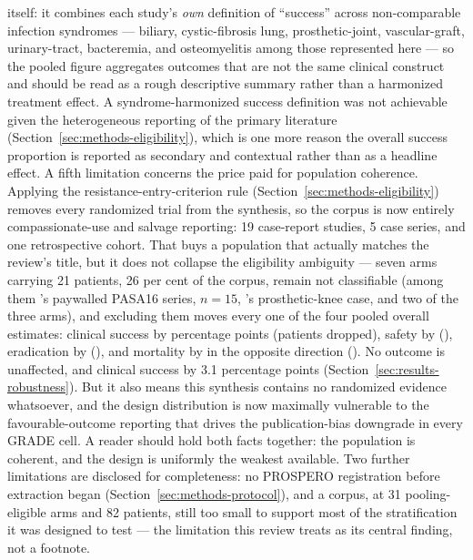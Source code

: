 itself: it combines each study's \emph{own} definition of ``success'' across non-comparable infection syndromes --- biliary, cystic-fibrosis lung, prosthetic-joint, vascular-graft, urinary-tract, bacteremia, and osteomyelitis among those represented here --- so the pooled figure aggregates outcomes that are not the same clinical construct and should be read as a rough descriptive summary rather than a harmonized treatment effect. A syndrome-harmonized success definition was not achievable given the heterogeneous reporting of the primary literature (Section~\ref{sec:methods-eligibility}), which is one more reason the overall success proportion is reported as secondary and contextual rather than as a headline effect. A fifth limitation concerns the price paid for population coherence. Applying the resistance-entry-criterion rule (Section~\ref{sec:methods-eligibility}) removes every randomized trial from the synthesis, so the corpus is now entirely compassionate-use and salvage reporting: 19 case-report studies, 5 case series, and one retrospective cohort. That buys a population that actually matches the review's title, but it does not collapse the eligibility ambiguity --- seven arms carrying 21 patients, 26 per cent of the corpus, remain not classifiable (among them \citeauthor{Onallah2023_med}'s paywalled PASA16 series, $n=15$, \textcite{Ferry2021_frontmed}'s prosthetic-knee case, and two of the three \textcite{Aslam2020_ofid} arms), and excluding them moves every one of the four pooled overall estimates: clinical success by \NcSensClinicalSuccessDeltaAbs percentage points (\NcSensClinicalSuccessDropped patients dropped), safety by \NcSensSafetyDeltaAbs (\NcSensSafetyDropped), eradication by \NcSensEradicationDeltaAbs (\NcSensEradicationDropped), and mortality by \NcSensMortalityDeltaAbs in the opposite direction (\NcSensMortalityDropped). No outcome is unaffected, and clinical success by 3.1 percentage points (Section~\ref{sec:results-robustness}). But it also means this synthesis contains no randomized evidence whatsoever, and the design distribution is now maximally vulnerable to the favourable-outcome reporting that drives the publication-bias downgrade in every GRADE cell. A reader should hold both facts together: the population is coherent, and the design is uniformly the weakest available. Two further limitations are disclosed for completeness: no PROSPERO registration before extraction began (Section~\ref{sec:methods-protocol}), and a corpus, at 31 pooling-eligible arms and 82 patients, still too small to support most of the stratification it was designed to test --- the limitation this review treats as its central finding, not a footnote.

